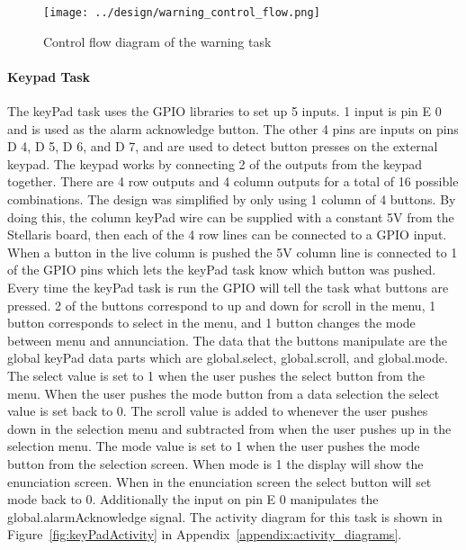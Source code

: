 \documentclass[12pt]{article} %
\begin{document}
		\begin{figure}[h]
			\centering
			\texttt{[image: ../design/warning\_control\_flow.png]}
			\caption{Control flow diagram of the warning task}
			\label{fig:warning_control}
		\end{figure}

    
    
    \paragraph{Keypad Task} The keyPad task uses the GPIO libraries to set up 5
    inputs. 1 input is pin E 0 and is used as the alarm acknowledge button. The
    other 4 pins are inputs on pins D 4, D 5, D 6, and D 7, and are used to
    detect button presses on the external keypad. The keypad works by
    connecting 2 of the outputs from the keypad together. There are 4 row
    outputs and 4 column outputs for a total of 16 possible combinations. The
    design was simplified by only using 1 column of 4 buttons. By doing this,
    the column keyPad wire can be supplied with a constant 5V from the
    Stellaris board, then each of the 4 row lines can be connected to a GPIO
    input. When a button in the live column is pushed the 5V column line is
    connected to 1 of the GPIO pins which lets the keyPad task know which
    button was pushed. Every time the keyPad task is run the GPIO will tell the
    task what buttons are pressed. 2 of the buttons correspond to up and down
    for scroll in the menu, 1 button corresponds to select in the menu, and 1
    button changes the mode between menu and annunciation. The data that the
    buttons manipulate are the global keyPad data parts which are
    global.select, global.scroll, and global.mode. The select value is set to 1 when the user pushes the select button from the menu. 
When the user pushes the mode button from a data selection the select value is set back to 0. 
The scroll value is added to whenever the user pushes down in the selection menu and subtracted from when the user pushes up in the selection menu.
The mode value is set to 1 when the user pushes the mode button from the selection screen. When mode is 1 the display will show the enunciation screen. 
When in the enunciation screen the select button will set mode back to 0.
Additionally the input on pin
    E 0 manipulates the global.alarmAcknowledge signal. The activity diagram
    for this task is shown in Figure~\ref{fig:keyPadActivity} in Appendix~\ref{appendix:activity_diagrams}.
\end{document}
